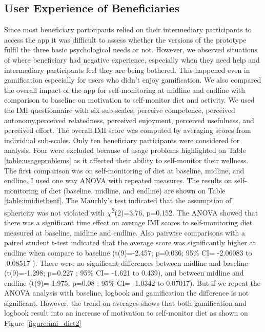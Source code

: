 \documentclass{sig-alternate}
\def\SP#1{\textsuperscript{\textcolor{black}{#1}}}
\begin{document}
\subsection{User Experience of Beneficiaries} 
Since most beneficiary participants relied on their intermediary participants to access the app it was difficult to assess whether the versions of the prototype fulfil the three basic psychological needs or not. However, we observed situations of where beneficiary had negative experience, especially when they need help and intermediary participants feel they are being bothered. This happened even in gamification especially for users who didn't enjoy gamification.\newline
We also compared the overall impact of the app for self-monitoring at midline and endline with comparison to baseline on motivation to self-monitor diet and activity. We used the IMI questionnaire with six sub-scales; perceive competence, perceived autonomy,perceived relatedness, perceived enjoyment,  perceived usefulness, and perceived effort. The overall IMI score was computed by averaging scores from individual sub-scales.
Only ten beneficiary participants were considered for analysis. Four were excluded because of usage problems highlighted on Table \ref{table:usageproblems} as it affected their ability to self-monitor their wellness.\newline
The first comparison was on self-monitoring of diet at baseline, midline, and endline. I used one way ANOVA with repeated measures. The results on self-monitoring of diet (baseline, midline, and endline) are shown on Table  \ref{table:imidietbenf}.  The Mauchly's test indicated that the assumption of sphericity was not violated with  $\chi{}$\SP{2}(2)=3.76, p=0.152. The ANOVA showed that there was a significant time effect on average IMI scores  to self-monitoring diet measured at baseline, midline and endline. Also pairwise comparisons with a paired student t-test indicated that the average score was significantly higher at endline when compare to baseline (t(9)=-2.457; p=0.036; 95\% CI= -2.06083 to -0.08517 ). There were no significant differences between midline and baseline (t(9)=-1.298; p=0.227 ; 95\% CI= -1.621 to 0.439), and between midline and endline (t(9)=-1.975; p=0.08 ; 95\% CI= -1.0342 to 0.07017). But if we repeat the ANOVA analysis with baseline, logbook and gamification the difference is not significant. However, the trend on averages shows that both gamification and logbook result into an increase of motivation to self-monitor diet as shown on Figure \ref{figure:imi_diet2}\newline
\end{document}
